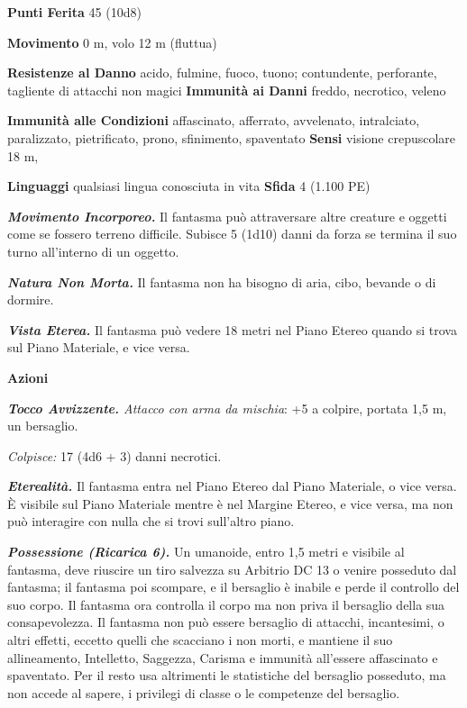 \begin{multicols}{2}
\textbf{Punti Ferita} 45 (10d8)

\textbf{Movimento} 0 m, volo 12 m (fluttua)

\textbf{Resistenze al Danno} acido, fulmine, fuoco, tuono; contundente,
perforante, tagliente di attacchi non magici \textbf{Immunità ai Danni}
freddo, necrotico, veleno

\textbf{Immunità alle Condizioni} affascinato, afferrato, avvelenato,
intralciato, paralizzato, pietrificato, prono, sfinimento, spaventato
\textbf{Sensi} visione crepuscolare 18 m, 

\textbf{Linguaggi} qualsiasi lingua conosciuta in vita \textbf{Sfida} 4
(1.100 PE)

\emph{\textbf{Movimento Incorporeo.}} Il fantasma può attraversare altre
creature e oggetti come se fossero terreno difficile. Subisce 5 (1d10)
danni da forza se termina il suo turno all'interno di un oggetto.

\emph{\textbf{Natura Non Morta.}} Il fantasma non ha bisogno di aria,
cibo, bevande o di dormire.

\emph{\textbf{Vista Eterea.}} Il fantasma può vedere 18 metri nel Piano
Etereo quando si trova sul Piano Materiale, e vice versa.

\textbf{Azioni}

\emph{\textbf{Tocco Avvizzente.} Attacco con arma da mischia}: +5 a
colpire, portata 1,5 m, un bersaglio.

\emph{Colpisce:} 17 (4d6 + 3) danni necrotici.

\emph{\textbf{Eterealità.}} Il fantasma entra nel Piano Etereo dal Piano
Materiale, o vice versa. È visibile sul Piano Materiale mentre è nel
Margine Etereo, e vice versa, ma non può interagire con nulla che si
trovi sull'altro piano.

\emph{\textbf{Possessione (Ricarica 6).}} Un umanoide, entro 1,5 metri e
visibile al fantasma, deve riuscire un tiro salvezza su Arbitrio DC 13 o
venire posseduto dal fantasma; il fantasma poi scompare, e il bersaglio
è inabile e perde il controllo del suo corpo. Il fantasma ora controlla
il corpo ma non priva il bersaglio della sua consapevolezza. Il fantasma
non può essere bersaglio di attacchi, incantesimi, o altri effetti,
eccetto quelli che scacciano i non morti, e mantiene il suo
allineamento, Intelletto, Saggezza, Carisma e immunità all'essere
affascinato e spaventato. Per il resto usa altrimenti le statistiche del
bersaglio posseduto, ma non accede al sapere, i privilegi di classe o le
competenze del bersaglio.


\end{multicols}
